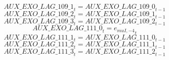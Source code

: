 \begin{dmath}
{AUX\_EXO\_LAG\_109\_1}_{t}={AUX\_EXO\_LAG\_109\_0}_{t-1}
\end{dmath}
\begin{dmath}
{AUX\_EXO\_LAG\_109\_2}_{t}={AUX\_EXO\_LAG\_109\_1}_{t-1}
\end{dmath}
\begin{dmath}
{AUX\_EXO\_LAG\_109\_3}_{t}={AUX\_EXO\_LAG\_109\_2}_{t-1}
\end{dmath}
\begin{dmath}
{AUX\_EXO\_LAG\_111\_0}_{t}={{e_{muI,-4}}}_{t}
\end{dmath}
\begin{dmath}
{AUX\_EXO\_LAG\_111\_1}_{t}={AUX\_EXO\_LAG\_111\_0}_{t-1}
\end{dmath}
\begin{dmath}
{AUX\_EXO\_LAG\_111\_2}_{t}={AUX\_EXO\_LAG\_111\_1}_{t-1}
\end{dmath}
\begin{dmath}
{AUX\_EXO\_LAG\_111\_3}_{t}={AUX\_EXO\_LAG\_111\_2}_{t-1}
\end{dmath}
